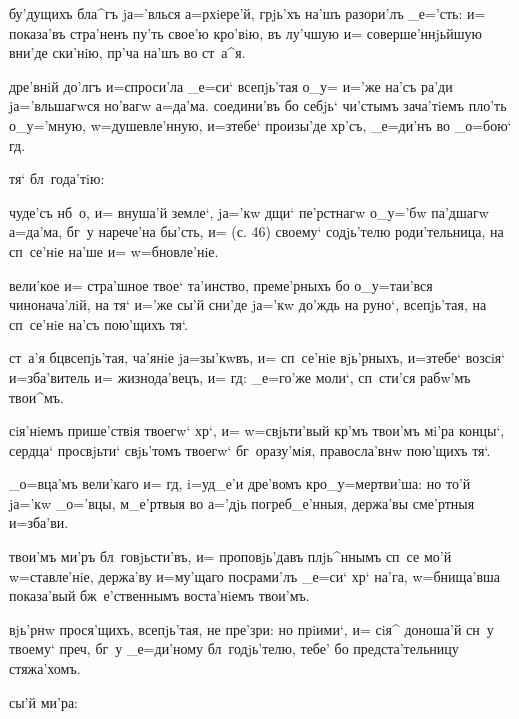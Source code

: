  бу'дущихъ бла^гъ jа='влься а=рхiере'й, 
грjь'хъ на'шъ разори'лъ _е='сть: и= показа'въ стра'ненъ 
пу'ть свое'ю кро'вiю, въ лу'чшую и= соверше'ннjьйшую 
вни'де ски'нiю, пр'ча на'шъ во ст~а^я.

  дре'внiй до'лгъ и=спроси'ла 
_е=си` всепjь'тая о_у= и='же на'съ ра'ди jа='вльшагwся 
но'вагw а=да'ма. соедини'въ бо себjь` чи'стымъ зача'тiемъ 
пло'ть о_у='мную, w=душевле'нную, и=з\ъ тебе` произы'де 
хр'съ, _е=ди'нъ во _о=бою` гд.

   тя` бл~года'тiю:

 чуде'съ нб~о, и= внуша'й земле`, jа='кw дщи` 
пе'рстнагw о_у='бw па'дшагw а=да'ма, бг~у нарече'на 
бы'сть, и= (с. 46) своему` содjь'телю роди'тельница, на 
сп~се'нiе на'ше и= w=бновле'нiе.

 вели'кое и= стра'шное твое` та'инство, 
преме'рныхъ бо о_у=таи'вся чинонача'лiй, на тя` и='же 
сы'й сни'де jа='кw до'ждь на руно`, всепjь'тая, на 
сп~се'нiе на'съ пою'щихъ тя`.

 ст~а'я бц всепjь'тая, ча'янiе jа=зы'кwвъ, 
и= сп~се'нiе вjь'рныхъ, и=з\ъ тебе` возсiя` и=зба'витель 
и= жизнода'вецъ, и= гд: _е=го'же моли`, сп~сти'ся 
рабw'мъ твои^мъ.


 сiя'нiемъ прише'ствiя твоегw` 
хр`, и= w=свjьти'вый кр'мъ твои'мъ мi'ра концы`, 
сердца` просвjьти` свjь'томъ твоегw` бг~оразу'мiя, 
правосла'внw пою'щихъ тя`.

 _о=вца'мъ вели'каго и= гд, i=уд_е'и 
дре'вомъ кр о_у=мертви'ша: но то'й jа='кw _о='вцы, 
м_е'ртвыя во а='дjь погреб_е'нныя, держа'вы сме'ртныя 
и=зба'ви.

 твои'мъ ми'ръ бл~говjьсти'въ, и= 
проповjь'давъ плjь^ннымъ сп~се мо'й w=ставле'нiе, 
держа'ву и=му'щаго посрами'лъ _е=си` хр` на'га, 
w=бнища'вша показа'вый бж~е'ственнымъ воста'нiемъ 
твои'мъ.

  вjь'рнw прося'щихъ, 
всепjь'тая, не пре'зри: но прiими`, и= сiя^ доноша'й сн~у 
твоему` преч, бг~у _е=ди'ному бл~годjь'телю, тебе' 
бо предста'тельницу стяжа'хомъ.

   сы'й ми'ра:

